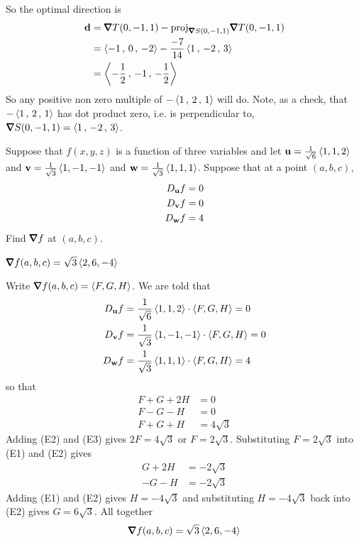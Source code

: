 \begin{solution}
So the optimal direction is
\begin{align*}
\vd&=\vnabla T(0,-1,1) -
\text{proj}_{\vnabla S(0,-1,1)}\vnabla T(0,-1,1) \\
&=\llt -1\,,\,0 \,,\,- 2\rgt
  -\frac{-7}{14}\llt 1\,,\, -2 \,,\,3\rgt \\
&= \llt -\frac{1}{2}\,,\,-1 \,,\,- \frac{1}{2}\rgt
\end{align*}
So any positive non zero multiple of $-\left< 1\,,\, 2\,,\,1\right>$ will do.
Note, as a check, that $-\left< 1\,,\, 2\,,\,1\right>$ has dot product zero,
i.e. is perpendicular to, $\vnabla S(0,-1,1)=\llt 1 \,,\, -2 \,,\, 3\rgt$.
\end{solution}

\begin{question}[M200 2014D] %
Suppose that $f(x,y,z)$ is a function of three variables and let 
$\mathbf{u} = \frac{1}{\sqrt{6}} \left< 1, 1, 2\right>$ 
and $\mathbf{v} = \frac{1}{\sqrt{3}} \left< 1, -1, -1\right>$ 
and $\mathbf{w} = \frac{1}{\sqrt{3}} \left< 1, 1, 1\right>$. 
Suppose that at a point $(a,b,c)$,
\begin{align*}
D_{\mathbf{u}} f&=0 \\
D_{\mathbf{v}} f&=0 \\
D_{\mathbf{w}} f&=4
\end{align*}
Find $\vnabla f$ at $(a,b,c)$.
\end{question}

%

\begin{answer}
$\vnabla f(a,b,c) =\sqrt{3} \llt 2,6,-4\rgt$
\end{answer}

\begin{solution}
Write $\vnabla f(a,b,c) =\llt F,G,H\rgt$. We are told that
\begin{align*}
D_{\mathbf{u}} f&=\frac{1}{\sqrt{6}} \left< 1, 1, 2\right> \cdot \left< F,G,H\right> = 0 \\
D_{\mathbf{v}} f&=\frac{1}{\sqrt{3}} \left< 1, -1, -1\right> \cdot \left< F,G,H\right> = 0 \\
D_{\mathbf{w}} f&=\frac{1}{\sqrt{3}} \left< 1, 1, 1\right> \cdot \left< F,G,H\right> = 4
\end{align*}
so that
\begin{align*}
 F + G + 2H &= 0 \tag{E1}\\
 F - G - H &= 0 \tag{E2}\\
 F + G + H &= 4\sqrt{3} \tag{E3}
\end{align*}
Adding (E2) and (E3) gives $2F=4\sqrt{3}$ or $F=2\sqrt{3}$.
Substituting $F=2\sqrt{3}$ into (E1) and (E2) gives
\begin{align*}
   G + 2H &= -2\sqrt{3} \tag{E1}\\
 - G - H &=  -2\sqrt{3} \tag{E2}
\end{align*}
Adding (E1) and (E2) gives $H=-4\sqrt{3}$ and substituting 
$H=-4\sqrt{3}$ back into (E2) gives $G=6\sqrt{3}$. All together
\begin{equation*}
\vnabla f(a,b,c) =\sqrt{3} \llt 2,6,-4\rgt
\end{equation*}
\end{solution}

